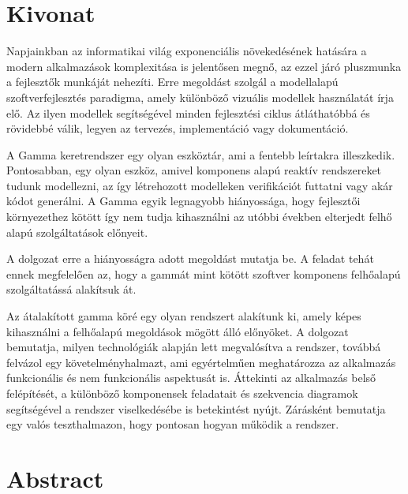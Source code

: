 \setcounter{page}{1}

\selecthungarian

\chapter*{Kivonat}
Napjainkban az informatikai világ exponenciális növekedésének hatására a modern alkalmazások komplexitása is jelentősen megnő, az ezzel járó pluszmunka a fejlesztők munkáját nehezíti. Erre megoldást szolgál a modellalapú szoftverfejlesztés paradigma, amely különböző vizuális modellek használatát írja elő. Az ilyen modellek segítségével minden fejlesztési ciklus átláthatóbbá és rövidebbé válik, legyen az tervezés, implementáció vagy dokumentáció.

A Gamma keretrendszer egy olyan eszköztár, ami a fentebb leírtakra illeszkedik. Pontosabban, egy olyan eszköz, amivel komponens alapú reaktív rendszereket tudunk modellezni, az így létrehozott modelleken verifikációt futtatni vagy akár kódot generálni. A Gamma egyik legnagyobb hiányossága, hogy fejlesztői környezethez kötött így nem tudja kihasználni az utóbbi években elterjedt felhő alapú szolgáltatások előnyeit.

A dolgozat erre a hiányosságra adott megoldást mutatja be. A feladat tehát ennek megfelelően az, hogy a gammát mint kötött szoftver komponens felhőalapú szolgáltatássá alakítsuk át.

Az átalakított gamma köré egy olyan rendszert alakítunk ki, amely képes kihasználni a felhőalapú megoldások mögött álló előnyöket. A dolgozat bemutatja, milyen technológiák alapján lett megvalósítva a rendszer, továbbá felvázol egy követelményhalmazt, ami egyértelműen meghatározza az alkalmazás funkcionális és nem funkcionális aspektusát is. Áttekinti az alkalmazás belső felépítését, a különböző komponensek feladatait és szekvencia diagramok segítségével a rendszer viselkedésébe is betekintést nyújt. Zárásként bemutatja egy valós teszthalmazon, hogy pontosan hogyan működik a rendszer.


\vfill
\selectenglish


\chapter*{Abstract}


